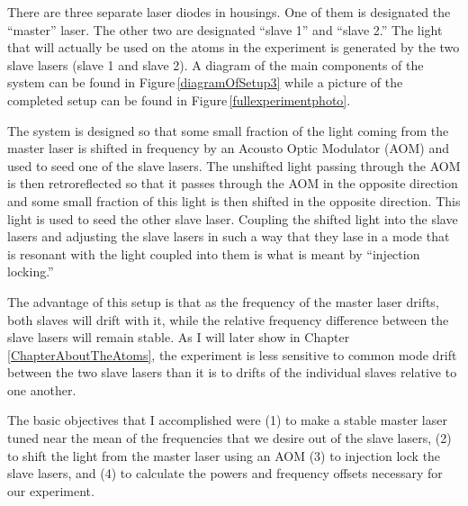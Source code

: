 There are three separate laser diodes in housings. One of them is designated the ``master'' laser. The other two are designated ``slave 1'' and ``slave 2.'' The light that will actually be used on the atoms in the experiment is generated by the two slave lasers (slave 1 and slave 2).
 A diagram of the main components of the system can be found in Figure\,\ref{diagramOfSetup3} while a picture of the completed setup can be found in Figure\,\ref{fullexperimentphoto}. 

The system is designed so that some small fraction of the light coming from the master laser is shifted in frequency by an Acousto Optic Modulator (AOM) and used to seed one of the slave lasers. The unshifted light passing through the AOM is then retroreflected so that it passes through the AOM in the opposite direction and some small fraction of this light is then shifted in the opposite direction. This light is used to seed the other slave laser. Coupling the shifted light into the slave lasers and adjusting the slave lasers in such a way that they lase in a mode that is resonant with the light coupled into them is what is meant by ``injection locking.'' 

The advantage of this setup is that as the frequency of the master laser drifts, both slaves will drift with it, while the relative frequency difference between the slave lasers will remain stable.  As I will later show in Chapter \ref{ChapterAboutTheAtoms}, the experiment is less sensitive to common mode drift between the two slave lasers than it is to drifts of the individual slaves relative to one another. 


The basic objectives that I accomplished were (1) to make a stable master laser tuned near the mean of the frequencies that we desire out of the slave lasers, (2) to shift the light from the master laser using an AOM (3) to injection lock the slave lasers, and (4) to calculate the powers and frequency offsets necessary for our experiment.

